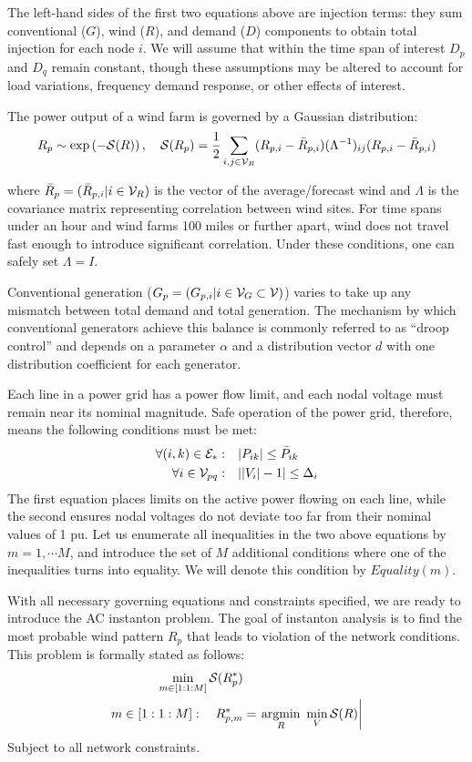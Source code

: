 The left-hand sides of the first two equations above are injection terms: they sum conventional ($G$), wind ($R$), and demand ($D$) components to obtain total injection for each node $i$. We will assume that within the time span of interest $D_{p}$ and $D_{q}$ remain constant, though these assumptions may be altered to account for load variations, frequency demand response, or other effects of interest.

The power output of a wind farm is governed by a Gaussian distribution:
$$\begin{align}
R_p\sim \exp\left(-{\cal S}(R)\right),\quad {\cal S}(R_p)=\frac{1}{2}\sum_{i,j\in{\cal V}_R}(R_{p,i}-\bar{R}_{p,i})(\Lambda^{-1})_{ij}(R_{p,i}-\bar{R}_{p,i})
\end{align}$$

where $\bar{R}_p =(\bar{R}_{p,i}|i\in{\cal V}_R)$ is the vector of the average/forecast wind and $\Lambda$ is the covariance matrix representing correlation between wind sites.  For time spans under an hour and wind farms 100 miles or further apart, wind does not travel fast enough to introduce significant correlation. Under these conditions, one can safely set $\Lambda = I$.

Conventional generation ($G_{p}=(G_{p,i}|i\in{\cal V}_G\subset{\cal V})$) varies to take up any mismatch between total demand and total generation. The mechanism by which conventional generators achieve this balance is commonly referred to as ``droop control'' and depends on a parameter $\alpha$ and a distribution vector $d$ with one distribution coefficient for each generator.

Each line in a power grid has a power flow limit, and each nodal voltage must remain near its nominal magnitude. Safe operation of the power grid, therefore, means the following conditions must be met:
$$\begin{align}
\forall (i,k)\in{\cal E}_*:&\quad |P_{ik}|\leq \bar{P}_{ik}\\
\forall i\in{\cal V}_{pq}:&\quad ||V_i|-1|\leq \Delta_i
\end{align}$$
The first equation places limits on the active power flowing on each line, while the second ensures nodal voltages do not deviate too far from their nominal values of 1 pu. Let us enumerate all inequalities in the two above equations by $m=1,\cdots M$, and introduce the set of $M$ additional conditions where one of the inequalities turns into equality. We will denote this condition by ${Equality}(m)$.

With all necessary governing equations and constraints specified, we are ready to introduce the AC instanton problem. The goal of instanton analysis is to find the most probable wind pattern $R_p$ that leads to violation of the network conditions. This problem is formally stated as follows:
$$\begin{align}
\min_{m\in [1:1:M]}{\cal S}(R_p^*)&\\
 m\in [1:1:M]:\quad R_{p,m}^* &=\left.\underset{R}{\mbox{argmin}} ~\min_V {\cal S}(R)\right|
\end{align}$$
Subject to all network constraints.

